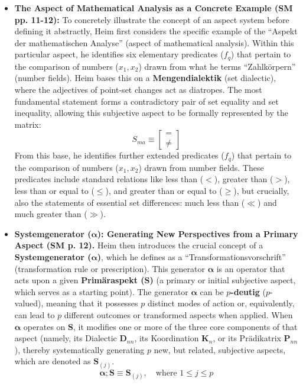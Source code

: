 \documentclass[12pt]{article}
\newcommand{\q}[1]{\enquote{#1}}
\begin{document}
\begin{itemize}
    \item \textbf{The Aspect of Mathematical Analysis as a Concrete Example (SM pp. 11-12):}
    To concretely illustrate the concept of an aspect system before defining it abstractly, Heim first considers the specific example of the \q{Aspekt der mathematischen Analyse} (aspect of mathematical analysis). Within this particular aspect, he identifies six elementary predicates (\(f_q\)) that pertain to the comparison of numbers (\(x_1, x_2\)) drawn from what he terms \q{Zahlkörpern} (number fields). Heim bases this on a \textbf{Mengendialektik} (set dialectic), where the adjectives of point-set changes act as diatropes. The most fundamental statement forms a contradictory pair of set equality and set inequality, allowing this subjective aspect to be formally represented by the matrix:
\begin{equation*}
S_{ma} \equiv \begin{bmatrix} = \\ \neq \end{bmatrix}
\end{equation*}
From this base, he identifies further extended predicates ($f_q$) that pertain to the comparison of numbers ($x_1, x_2$) drawn from number fields. These predicates include standard relations like less than ($<$), greater than ($>$), less than or equal to ($\leq$), and greater than or equal to ($\geq$), but crucially, also the statements of essential set differences: much less than ($\ll$) and much greater than ($\gg$).

    \item \textbf{Systemgenerator (\(\bm{\alpha}\)): Generating New Perspectives from a Primary Aspect (SM p. 12).}
    Heim then introduces the crucial concept of a \textbf{Systemgenerator (\(\bm{\alpha}\))}, which he defines as a \q{Transformationsvorschrift} (transformation rule or prescription). This generator \( \bm{\alpha} \) is an operator that acts upon a given \textbf{Primäraspekt (\(\mathbf{S}\))} (a primary or initial subjective aspect, which serves as a starting point). The generator \( \bm{\alpha} \) can be \textbf{\(p\)-deutig} (\(p\)-valued), meaning that it possesses \( p \) distinct modes of action or, equivalently, can lead to \( p \) different outcomes or transformed aspects when applied. When \( \bm{\alpha} \) operates on \( \mathbf{S} \), it modifies one or more of the three core components of that aspect (namely, its Dialectic \( \mathbf{D}_{nn} \), its Koordination \( \mathbf{K}_n \), or its Prädikatrix \( \mathbf{P}_{nn} \)), thereby systematically generating \( p \) new, but related, subjective aspects, which are denoted as \( \mathbf{S}_{(j)} \).
    \begin{equation*}
    \bm{\alpha};\mathbf{S} \equiv \mathbf{S}_{(j)}, \quad \text{where } 1 \leq j \leq p
    \end{equation*}


\end{itemize}
\end{document}
